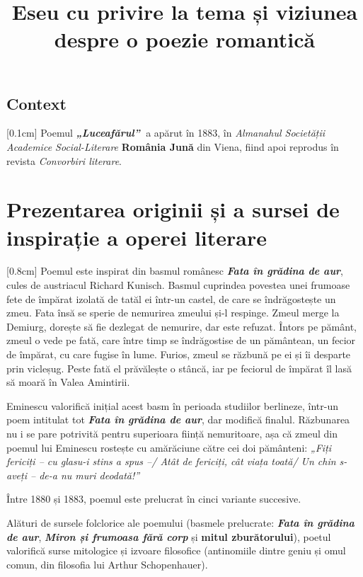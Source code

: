 \documentclass[
12pt,                        %
a4paper                      %
]{article}
\title{Eseu cu privire la tema și viziunea despre o poezie romantică}
\date{}   %
\author{} %
\newcommand{\operatitle}{\textbf{\textit{„Luceafărul”\ }}} %
\newcommand{\operaorigtitle}{\textbf{\textit{Fata în grădina de aur}}}
\begin{document}
\maketitle %



\subsection{Context}

[0.1cm]
Poemul \operatitle a apărut în 1883, în \textit{Almanahul Societății Academice Social-Literare} \textbf{România Jună} din Viena, fiind apoi reprodus în revista \textit{Convorbiri literare}.

\section{Prezentarea originii și a sursei de inspirație a operei literare}

[0.8cm]
Poemul este inspirat din basmul românesc \operaorigtitle, cules de austriacul Richard Kunisch. Basmul cuprindea povestea unei frumoase fete de împărat izolată de tatăl ei într-un castel, de care se îndrăgostește un zmeu. Fata însă se sperie de nemurirea zmeului și-l respinge. Zmeul merge la Demiurg, dorește să fie dezlegat de nemurire, dar este refuzat. Întors pe pământ, zmeul o vede pe fată, care între timp se îndrăgostise de un pământean, un fecior de împărat, cu care fugise în lume. Furios, zmeul se răzbună pe ei și îi desparte prin vicleșug. Peste fată el prăvălește o stâncă, iar pe feciorul de împărat îl lasă să moară în Valea Amintirii.

Eminescu valorifică inițial acest basm în perioada studiilor berlineze, într-un poem intitulat tot \textbf{\textit{Fata în grădina de aur}}, dar modifică finalul. Răzbunarea nu i se pare potrivită pentru superioara ființă nemuritoare, așa că zmeul din poemul lui Eminescu rostește cu amărăciune către cei doi pământeni: \textit{„Fiți fericiți -- cu glasu-i stins a spus --/ Atât de fericiți, cât viața toată/ Un chin s-aveți -- de-a nu muri deodată!”}

Între 1880 și 1883, poemul este prelucrat în cinci variante succesive.

Alături de sursele folclorice ale poemului (basmele prelucrate: \operaorigtitle, \textbf{\textit{Miron și frumoasa fără corp}} și \textbf{mitul zburătorului}), poetul valorifică surse mitologice și izvoare filosofice (antinomiile dintre geniu și omul comun, din filosofia lui Arthur Schopenhauer).
\end{document}
